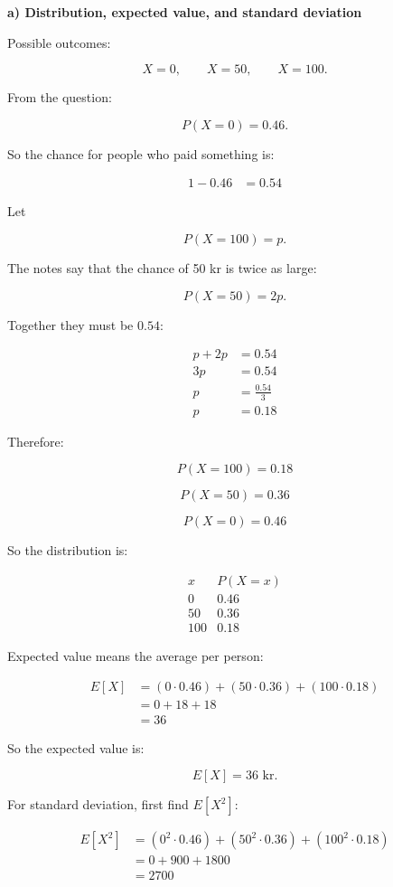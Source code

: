 \documentclass[10pt]{article}
\begin{document}
\RepeatedQuestion{\uppgiftFourQuestion}
\textbf{a) Distribution, expected value, and standard deviation}

Possible outcomes:

\[
X=0,\qquad X=50,\qquad X=100.
\]

From the question:

\[
P(X=0)=0.46.
\]

So the chance for people who paid something is:

\begin{align*}
1-0.46
&=0.54
\end{align*}

Let

\[
P(X=100)=p.
\]

The notes say that the chance of 50 kr is twice as large:

\[
P(X=50)=2p.
\]

Together they must be $0.54$:

\begin{align*}
p+2p
&=0.54 \\[2mm]
3p
&=0.54 \\[2mm]
p
&=\frac{0.54}{3} \\[2mm]
p
&=0.18
\end{align*}

Therefore:

\[
P(X=100)=0.18
\]

\[
P(X=50)=0.36
\]

\[
P(X=0)=0.46
\]

So the distribution is:

\[
\begin{array}{c|c}
x & P(X=x)\\
\hline
0 & 0.46\\
50 & 0.36\\
100 & 0.18
\end{array}
\]

Expected value means the average per person:

\begin{align*}
E[X]
&=
(0\cdot 0.46)
+(50\cdot 0.36)
+(100\cdot 0.18) \\[2mm]
&=
0+18+18 \\[2mm]
&=36
\end{align*}

So the expected value is:

\[
E[X]=36\text{ kr}.
\]

For standard deviation, first find $E[X^2]$:

\begin{align*}
E[X^2]
&=
(0^2\cdot 0.46)
+(50^2\cdot 0.36)
+(100^2\cdot 0.18) \\[2mm]
&=
0+900+1800 \\[2mm]
&=2700
\end{align*}
\end{document}
